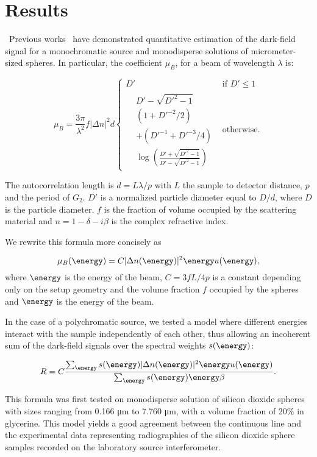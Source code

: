 \section{Results}\label{sec:model}
\
Previous works~\cite{Lynch:11,Gkoumas2016} have demonstrated quantitative estimation of
the dark-field signal for a monochromatic source and monodisperse solutions
of micrometer-sized spheres. In particular, the coefficient $\mu_B$, for a
beam of wavelength $\lambda$ is:

\begin{equation}
\mu_B = \frac{3\pi}{\lambda^2}f |\Delta n|^2 d
    \begin{cases}
    D' & \text{if } D' \leqslant 1\\
    \begin{align}
    & D' - \sqrt{D'^2 - 1}\\
    & (1 + D'^{-2}/2) \\
    & + (D'^{-1} + D'^{-3} / 4) \\
    & \log\left(\frac{D' + \sqrt{D'^2 - 1}}{D' - \sqrt{D'^2 - 1}}\right)
    \end{align} & \text{otherwise.}
    \end{cases}
    \label{eqn:lynch}
\end{equation}

The autocorrelation length is $d = L\lambda / p$ with $L$ the sample to
detector distance, $p$ and the period of $G_2$. $D'$ is a normalized
particle diameter equal to $D/d$, where $D$ is the particle diameter. $f$ is
the fraction of volume occupied by the scattering material and $n = 1 -
\delta - i\beta$ is the complex refractive index.

We rewrite this formula more concisely as

\begin{equation}
    \mu_B(\energy) = C |\Delta n(\energy)|^2 \energy u(\energy),
    \label{eqn:lynchshort}
\end{equation}
where $\energy$ is the energy of the beam, $C = 3 fL / 4p$ is a constant
depending only on the setup geometry and the volume fraction $f$ occupied by
the spheres and $\energy$ is the energy of the beam.


In the case of a polychromatic source, we tested a model where different
energies interact with the sample independently of each other, thus allowing
an incoherent sum of the dark-field signals over the spectral weights
$s(\energy)$:

\begin{equation}
    R = C \frac{\sum_\energy s(\energy)|\Delta n(\energy)|^2 \energy u(\energy)}{\sum_\energy s(\energy) \energy \beta}.
    \label{eqn:lynchpolychromatic}
\end{equation}

This formula was first tested on monodisperse solution of silicon dioxide
spheres with sizes ranging from 0.166 μm to 7.760 μm, with a volume fraction of 20\%
in glycerine. This model yields a good agreement between the continuous line
and the experimental data representing radiographies of the silicon dioxide
sphere samples recorded on the laboratory source interferometer.